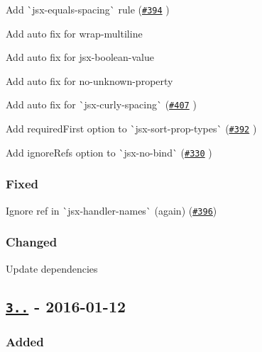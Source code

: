 \begin{DoxyItemize}
\item Add \`{}jsx-\/equals-\/spacing\`{} rule (\href{https://github.com/yannickcr/eslint-plugin-react/issues/394}{\tt \#394} )
\item Add auto fix for {\ttfamily wrap-\/multiline}
\item Add auto fix for {\ttfamily jsx-\/boolean-\/value}
\item Add auto fix for {\ttfamily no-\/unknown-\/property}
\item Add auto fix for \`{}jsx-\/curly-\/spacing\`{} (\href{https://github.com/yannickcr/eslint-plugin-react/pull/407}{\tt \#407} )
\item Add {\ttfamily required\+First} option to \`{}jsx-\/sort-\/prop-\/types\`{} (\href{https://github.com/yannickcr/eslint-plugin-react/pull/392}{\tt \#392} )
\item Add {\ttfamily ignore\+Refs} option to \`{}jsx-\/no-\/bind\`{} (\href{https://github.com/yannickcr/eslint-plugin-react/issues/330}{\tt \#330} )
\end{DoxyItemize}

\subsubsection*{Fixed}


\begin{DoxyItemize}
\item Ignore {\ttfamily ref} in \`{}jsx-\/handler-\/names\`{} (again) (\href{https://github.com/yannickcr/eslint-plugin-react/issues/396}{\tt \#396})
\end{DoxyItemize}

\subsubsection*{Changed}


\begin{DoxyItemize}
\item Update dependencies
\end{DoxyItemize}

\subsection*{\href{https://github.com/yannickcr/eslint-plugin-react/compare/v3.14.0...v3.15.0}{\tt 3..} -\/ 2016-\/01-\/12}

\subsubsection*{Added}



